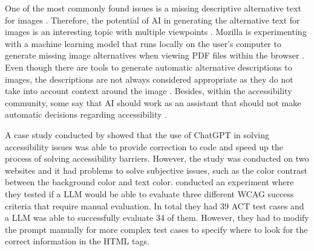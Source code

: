 One of the most commonly found issues is a missing descriptive alternative text for images \citep{webaimmillions, dequecoverage}. Therefore, the potential of AI in generating the alternative text for images is an interesting topic with multiple viewpoints \citep{ai_wcag_email, boia_alt_text, potential_for_ai}. Mozilla is experimenting with a machine learning model that runs locally on the user's computer to generate missing image alternatives when viewing PDF files within the browser \citep{alt_image_mozilla}. Even though there are tools to generate automatic alternative descriptions to images, the descriptions are not always considered appropriate as they do not take into account context around the image \citep{accessibility_and_ai, boia_alt_text}. Besides, within the accessibility community, some say that AI should work as an assistant that should not make automatic decisions regarding accessibility \citep{ai_wcag_email, accessibility_and_ai}.

A case study conducted by \textcite{10.1145/3594806.3596542_case_study_gpt} showed that the use of ChatGPT in solving accessibility issues was able to provide correction to code and speed up the process of solving accessibility barriers. However, the study was conducted on two websites and it had problems to solve subjective issues, such as the color contrast between the background color and text color. \textcite{Lopez2024Turning} conducted an experiment where they tested if a LLM would be able to evaluate three different WCAG success criteria that require manual evaluation. In total they had 39 ACT test cases and a LLM was able to successfully evaluate 34 of them. However, they had to modify the prompt manually for more complex test cases to specify where to look for the correct information in the HTML tags.

